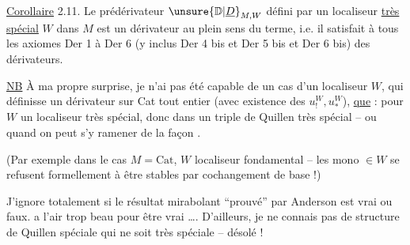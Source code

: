 
\uline{Corollaire} 2.11. Le prédérivateur $\unsure{\mathbb{D}|\underline{D}}_{M,W}$ défini
par un localiseur \uline{très spécial} $W$ dans $M$
est un dérivateur au plein sens du terme,
i.e. il satisfait à tous les axiomes
Der 1 à Der 6 (y inclus Der 4 bis et
Der 5 bis et Der 6 bis) des dérivateurs.

\uline{NB} À ma propre surprise, je n'ai pas été capable
de  un cas d'un localiseur $W$,
qui définisse un dérivateur sur Cat tout
entier (avec existence des $u_!^W,u_*^W$),
\uline{que} : pour $W$ un localiseur très spécial,
donc  dans \unsure{:} un triple de
Quillen très spécial -- ou quand on
peut s'y ramener de la façon .

(Par exemple dans le cas  $M=\mathrm{Cat}$, $W$
localiseur fondamental  -- les
mono $\in W$ se refusent formellement à
être stables par cochangement de base !)


J'ignore totalement si le résultat mirabolant
``prouvé'' par Anderson est vrai ou faux.  a l'air
 trop beau pour être vrai \ldots. D'ailleurs, je ne
connais pas de structure de Quillen spéciale qui
ne soit très spéciale -- désolé !

